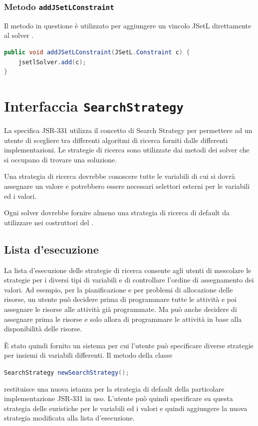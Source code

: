 \subsubsection{Metodo \texttt{addJSetLConstraint}}
Il metodo in questione è utilizzato per aggiungere un vincolo JSetL direttamente
al solver .
\begin{lstlisting}[language = Java,
                   caption = {\files{addJSetLConstraint}.}
                  ]
public void addJSetLConstraint(JSetL.Constraint c) {
	jsetlSolver.add(c);
}
\end{lstlisting}



\section{Interfaccia \texttt{SearchStrategy}}
La specifica JSR-331 utilizza il concetto di Search Strategy per permettere
ad un utente di scegliere tra differenti algoritmi di ricerca forniti
dalle differenti implementazioni. Le strategie di ricerca sono utilizzate
dai metodi dei solver che si occupano di trovare una soluzione.

Una strategia di ricerca dovrebbe conoscere tutte le variabili di cui si dovrà
assegnare un valore e potrebbero essere necessari
selettori esterni per le variabili ed i valori.

Ogni solver dovrebbe fornire almeno una strategia di ricerca 
 di default da utilizzare nei costruttori del .

\subsection{Lista d'esecuzione}
La lista d'esecuzione delle strategie di ricerca  consente agli utenti di 
mescolare le strategie per i diversi tipi di variabili e di controllare
l'ordine di assegnamento dei valori. Ad esempio, per la pianificazione e per
problemi di allocazione delle risorse, un utente può decidere prima di 
programmare tutte le attività e poi assegnare le risorse alle attività già 
programmate. Ma  può anche decidere di assegnare prima le risorse e solo 
allora di programmare le attività in base alla disponibilità delle risorse.

\`E stato quindi fornito un sistema per cui l'utente può specificare diverse
strategie per insiemi di variabili differenti. Il metodo della classe
\begin{center}
\lstinline[language = Java]$SearchStrategy newSearchStrategy();$
\end{center}
restituisce una nuova istanza per la strategia di default della particolare
implementazione JSR-331 in uso. L'utente può quindi specificare su questa
strategia delle euristiche per le variabili ed i valori e quindi aggiungere la
nuova strategia modificata alla lista d'esecuzione.


